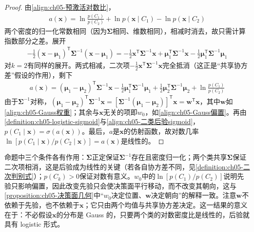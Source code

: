 \documentclass[../../main.tex]{subfiles}
\begin{document}
\begin{proof}
由\eqref{align:ch05-预激活对数比}，
\begin{align}
  a(\boldsymbol{x})=\ln\frac{p(C_1)}{p(C_2)}+\ln p(\boldsymbol{x}\mid C_1)-\ln p(\boldsymbol{x}\mid C_2)
\end{align}
两个密度的归一化常数相同（因为$\boldsymbol{\Sigma}$相同、维数相同），相减时消去，故只需计算指数部分之差。展开
\begin{align}
  -\frac{1}{2}(\boldsymbol{x}-\boldsymbol{\mu}_1)^{\mathsf{T}}\boldsymbol{\Sigma}^{-1}(\boldsymbol{x}-\boldsymbol{\mu}_1)
  =-\frac{1}{2}\boldsymbol{x}^{\mathsf{T}}\boldsymbol{\Sigma}^{-1}\boldsymbol{x}+\boldsymbol{\mu}_1^{\mathsf{T}}\boldsymbol{\Sigma}^{-1}\boldsymbol{x}-\frac{1}{2}\boldsymbol{\mu}_1^{\mathsf{T}}\boldsymbol{\Sigma}^{-1}\boldsymbol{\mu}_1
\end{align}
对$k=2$有同样的展开。两式相减，二次项$-\frac{1}{2}\boldsymbol{x}^{\mathsf{T}}\boldsymbol{\Sigma}^{-1}\boldsymbol{x}$完全抵消（这正是“共享协方差”假设的作用），剩下
\begin{align}
  a(\boldsymbol{x})=(\boldsymbol{\mu}_1-\boldsymbol{\mu}_2)^{\mathsf{T}}\boldsymbol{\Sigma}^{-1}\boldsymbol{x}-\frac{1}{2}\boldsymbol{\mu}_1^{\mathsf{T}}\boldsymbol{\Sigma}^{-1}\boldsymbol{\mu}_1+\frac{1}{2}\boldsymbol{\mu}_2^{\mathsf{T}}\boldsymbol{\Sigma}^{-1}\boldsymbol{\mu}_2+\ln\frac{p(C_1)}{p(C_2)}
\end{align}
由于$\boldsymbol{\Sigma}^{-1}$对称，$(\boldsymbol{\mu}_1-\boldsymbol{\mu}_2)^{\mathsf{T}}\boldsymbol{\Sigma}^{-1}\boldsymbol{x}=[\boldsymbol{\Sigma}^{-1}(\boldsymbol{\mu}_1-\boldsymbol{\mu}_2)]^{\mathsf{T}}\boldsymbol{x}=\boldsymbol{w}^{\mathsf{T}}\boldsymbol{x}$，其中$\boldsymbol{w}$如\eqref{align:ch05-Gauss权重}；其余与$\boldsymbol{x}$无关的项即$w_0$，如\eqref{align:ch05-Gauss偏置}。再由\cref{definition:ch05-logistic-sigmoid}与\eqref{align:ch05-二类后验sigmoid}，$p(C_1\mid\boldsymbol{x})=\sigma(a(\boldsymbol{x}))$。最后，$a$是$\boldsymbol{x}$的仿射函数，故对数几率$\ln[p(C_1\mid\boldsymbol{x})/p(C_2\mid\boldsymbol{x})]=a(\boldsymbol{x})$是线性的。
\end{proof}

\begin{remark}
命题中三个条件各有作用：$\boldsymbol{\Sigma}$正定保证$\boldsymbol{\Sigma}^{-1}$存在且密度归一化；两个类共享$\boldsymbol{\Sigma}$保证二次项相消，这是后验成为线性的关键（若各自协方差不同，见\cref{definition:ch05-二次判别式}）；$p(C_k)>0$保证对数有意义。$w_0$中的$\ln[p(C_1)/p(C_2)]$说明先验只影响偏置，因此改变先验只会使决策面平行移动，而不改变其朝向，这与\cref{proposition:ch05-决策面几何}中“$w_0$决定位置、$\boldsymbol{w}$决定朝向”的解释一致。注意$\boldsymbol{w}$不依赖于先验，也不依赖于$\boldsymbol{x}$；它只由两个均值与共享协方差决定。这一结果的意义在于：不必假设$\boldsymbol{x}$的分布是 Gauss 的，只要两个类的对数密度比是线性的，后验就具有 logistic 形式。
\end{remark}
\end{document}
